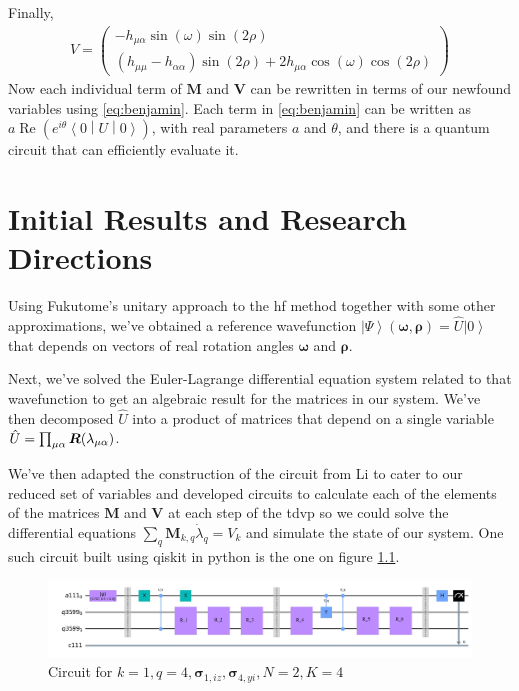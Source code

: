 \documentclass{aux/ttuthes2007}
\newcommand{\ket}[1]{\ensuremath{\left|#1\right\rangle}}
\newcommand{\sandwich}[3]{\left< #1 \middle\vert #2 \middle\vert #3 \right>}
\newcommand{\s}[1]{\sin\left( #1 \right)}
\newcommand{\co}[1]{\cos\left( #1 \right)}
\newcommand{\paren}[1]{\left( #1 \right)}
\newcommand{\elec}{N}
\newcommand{\orb}{K}
\newcommand{\ind}[1]{{\uo #1 \oo #1}}
\newcommand{\uo}[1]{
		\IfEqCase{#1}{
			{0}{\mu}
			{1}{\nu}
			{2}{\xi}
		}[\PackageError{uo}{Undefined option to uo: #1}{}]
}
\newcommand{\oo}[1]{
		\IfEqCase{#1}{
			{0}{\alpha}
			{1}{\beta}
			{2}{\gamma}
		}[\PackageError{unocorb}{Undefined option to unuo: #1}{}]
}
\begin{document}
%
Finally,
%
\begin{equation*}
	\begin{split}
		V = \begin{pmatrix}
			- h_{\mu\alpha} \s \omega \s {2\rho} \\
			(h_{\mu\mu} - h_{\alpha\alpha}) \s {2\rho}
			+ 2h_{\mu\alpha} \co \omega \co {2\rho}
		\end{pmatrix}
	\end{split}
\end{equation*}
%
Now each individual term of $\bm M$ and $\bm V$ can be rewritten in terms of our newfound variables using \ref{eq:benjamin}.
%
Each term in \ref{eq:benjamin} can be written as $a\operatorname{Re}\paren{e^{i\theta}\sandwich 0 U 0}$, with real parameters $a$ and $\theta$, and there is a quantum circuit that can efficiently evaluate it.
%
%


\chapter{\textbf{Initial Results and Research Directions}}\label{chap:results}

Using Fukutome's  unitary approach to the \gls{hf} method together with some other approximations, we've obtained a reference wavefunction $\ket \Psi(\bm \omega, \bm \rho) = \hat U\ket 0$ that depends on vectors of real rotation angles $\bm \omega$ and $\bm \rho$.

Next, we've solved the Euler-Lagrange differential equation system related to that wavefunction to get an algebraic result for the matrices in our system.
We've then decomposed $\hat U$ into a product of matrices that depend on a single variable $\hat U = \prod_{\ind 0} \bm R(\lambda_{\ind 0})$.

We've then adapted the construction of the circuit from Li  to cater to our reduced set of variables and developed circuits to calculate each of the elements of the matrices $\bm M$ and $\bm V$ at each step of the \gls{tdvp} so we could solve the differential equations $\sum_q \bm M_{k,q}\dot{\lambda}_q = V_k$ and simulate the state of our system. One such circuit built using qiskit in python is the one on figure \ref{fig:circuit}. 
\begin{figure}[hb!]
  \includegraphics[width=\linewidth]{img/circuit.jpg}
  \caption{Circuit for $k = 1, q = 4, \bm \sigma_{1, iz}, \bm \sigma_{4, yi}, \elec = 2, \orb = 4$}
  \label{fig:circuit}
\end{figure}
\end{document}
